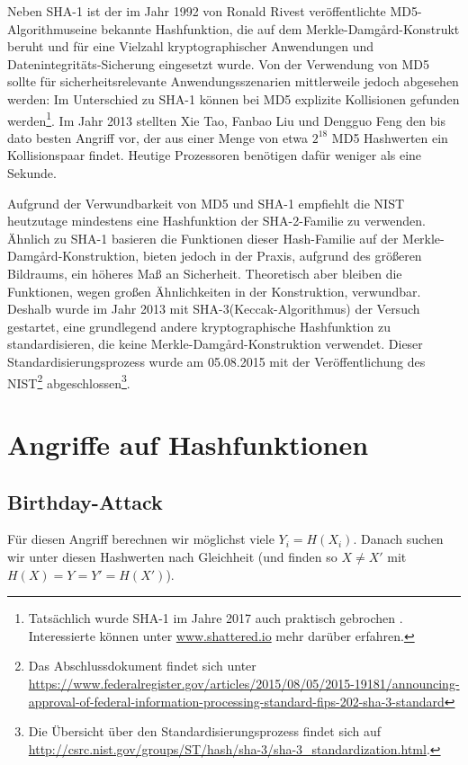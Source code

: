 Neben SHA-1 ist der im Jahr 1992 von Ronald Rivest veröffentlichte
MD5-Algorithmus\indexMDFive eine bekannte Hashfunktion, die auf dem
Merkle-Damgård-Konstrukt beruht und für eine Vielzahl kryptographischer
Anwendungen und Datenintegritäts-Sicherung eingesetzt wurde. Von der
Verwendung von MD5 sollte für sicherheitsrelevante Anwendungsszenarien
mittlerweile jedoch abgesehen werden: Im Unterschied zu SHA-1 können bei
MD5 explizite Kollisionen gefunden werden\footnote{Tatsächlich wurde SHA-1 im Jahre 2017 auch praktisch gebrochen \cite{Stevens2017}. Interessierte können unter \url{www.shattered.io} mehr darüber erfahren.}. Im Jahr 2013 stellten Xie
Tao, Fanbao Liu und Dengguo Feng den bis dato besten Angriff vor, der
aus einer Menge von etwa $2^{18}$ MD5 Hashwerten ein Kollisionspaar
findet. Heutige Prozessoren benötigen dafür weniger als eine Sekunde.

Aufgrund der Verwundbarkeit von MD5 und SHA-1 empfiehlt die NIST
heutzutage mindestens eine Hashfunktion der SHA-2-Familie\indexSHATwo
zu verwenden. Ähnlich zu SHA-1 basieren die Funktionen dieser
Hash-Familie auf der Merkle-Damgård-Konstruktion, bieten jedoch in der
Praxis, aufgrund des größeren Bildraums, ein höheres Maß an
Sicherheit. Theoretisch aber bleiben die Funktionen, wegen großen
Ähnlichkeiten in der Konstruktion, verwundbar. Deshalb wurde im Jahr
2013 mit SHA-3\indexSHAThree (\glqq Keccak\grqq{}-Algorithmus) der
Versuch gestartet, eine grundlegend andere kryptographische Hashfunktion
zu standardisieren, die keine Merkle-Damgård-Konstruktion
verwendet. Dieser Standardisierungsprozess wurde am 05.08.2015 mit der
Veröffentlichung des NIST\footnote{Das Abschlussdokument findet sich
unter
\url{https://www.federalregister.gov/articles/2015/08/05/2015-19181/announcing-approval-of-federal-information-processing-standard-fips-202-sha-3-standard}}
abgeschlossen\footnote{Die Übersicht über den Standardisierungsprozess
findet sich auf
\url{http://csrc.nist.gov/groups/ST/hash/sha-3/sha-3_standardization.html}.}.


\section{Angriffe auf Hashfunktionen}
\subsection{Birthday-Attack}\indexBirthDayAttack
Für diesen Angriff berechnen wir möglichst viele $Y_i = H(X_i)$.
Danach suchen wir unter diesen Hashwerten nach Gleichheit (und finden so
$X \not = X'$ mit $H(X) = Y = Y' = H(X')$). 
